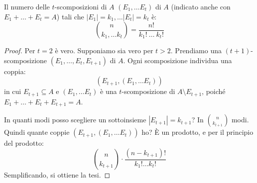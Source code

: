 \begin{prop}\label{coeff_mult_valore}
Il numero delle $t$-scomposizioni di $A$ $(E_1, \dots E_t)$ di $A$ (indicato anche con $E_1 + \dots + E_t = A$) tali che $|E_1| = k_1, \dots |E_t| = k_t$ \`e:
\begin{equation}
\binom{n}{k_1, \dots k_t} = \frac{n!}{k_1! \ \dots \ k_t!}
\end{equation}
\end{prop}
\begin{proof}
Per $t = 2$ \`e vero. Supponiamo sia vero per $t > 2$. Prendiamo una $(t+1)$-scomposizione $(E_1, \dots, E_t, E_{t+1})$ di $A$. Ogni scomposizione individua una coppia:
\[
\left( E_{t+1}, (E_1, \dots E_t) \right)
\]
in cui $E_{t+1} \subseteq A$ e $(E_1, \dots E_t)$ \`e una $t$-scomposizione di $A \setminus E_{t+1}$, poich\'e $E_1 + \dots + E_t + E_{t+1} = A$.

In quanti modi posso scegliere un sottoinsieme $|E_{t+1}| = k_{t+1}$? In $\binom{n}{k_{t+1}}$ modi. Quindi quante coppie $(E_{t+1}, (E_1, \dots E_t))$ ho? \`E un prodotto, e per il principio del prodotto:
\[
\binom{n}{k_{t+1}} \cdot \frac{(n - k_{t+1})!}{k_1! \dots k_{t}!}
\]
Semplificando, si ottiene la tesi.
\end{proof}

